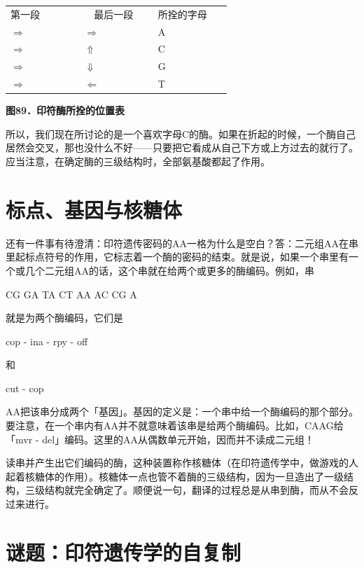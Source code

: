 \documentclass[
  12pt,
  twoside,
  openright,
  oldfontcommands,
]{memoir}
\begin{document}
\begin{longtable}[]{>{\raggedright\arraybackslash}p{0.313\linewidth} >{\raggedright\arraybackslash}p{0.313\linewidth} >{\raggedright\arraybackslash}p{0.313\linewidth}}
\toprule\noalign{}
\endhead
\bottomrule\noalign{}
\endlastfoot
第一段 & 　最后一段　 & 所拴的字母 \\
$\Rightarrow$ & $\Rightarrow$ & A \\
$\Rightarrow$ & $\Uparrow$ & C \\
$\Rightarrow$ & $\Downarrow$ & G \\
$\Rightarrow$ & $\Leftarrow$ & T \\
\end{longtable}

\label{fig:89}
\begin{center}\small\textbf{图89．印符酶所拴的位置表}\end{center}

所以，我们现在所讨论的是一个喜欢字母C的酶。如果在折起的时候，一个酶自己居然会交叉，那也没什么不好------只要把它看成从自己下方或上方过去的就行了。应当注意，在确定酶的三级结构时，全部氨基酸都起了作用。

\section{标点、基因与核糖体}

还有一件事有待澄清：印符遗传密码的AA一格为什么是空白？答：二元组AA在串里起标点符号的作用，它标志着一个酶的密码的结束。就是说，如果一个串里有一个或几个二元组AA的话，这个串就在给两个或更多的酶编码。例如，串

CG GA TA CT AA AC CG A

就是为两个酶编码，它们是

cop - ina - rpy - off

和

cut - cop

AA把该串分成两个「基因」。基因的定义是：一个串中给一个酶编码的那个部分。要注意，在一个串内有AA并不就意味着该串是给两个酶编码。比如，CAAG给「mvr
- del」编码。这里的AA从偶数单元开始，因而并不读成二元组！

读串并产生出它们编码的酶，这种装置称作核糖体（在印符遗传学中，做游戏的人起着核糖体的作用）。核糖体一点也管不着酶的三级结构，因为一旦造出了一级结构，三级结构就完全确定了。顺便说一句，翻译的过程总是从串到酶，而从不会反过来进行。

\section{谜题：印符遗传学的自复制}
\end{document}
